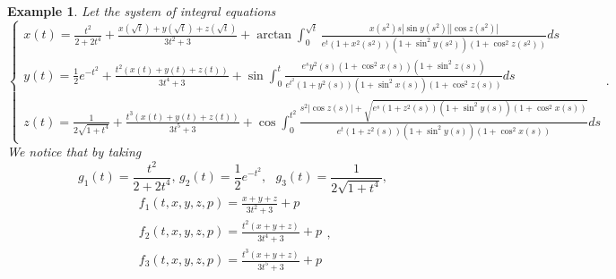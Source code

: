 \documentclass{amsart}
\theoremstyle{plain}
\newtheorem{example}{Example}
\numberwithin{equation}{section}
\begin{document}
\begin{example}
Let the system of integral equations\begin{equation*}
\left\{ 
\begin{array}{l}
x\left( t\right) =\frac{t^{2}}{2+2t^{4}}+\frac{x\left( \sqrt{t}\right)
+y\left( \sqrt{t}\right) +z\left( \sqrt{t}\right) }{3t^{2}+3}+\arctan
\int_{0}^{\sqrt{t}}\frac{x\left( s^{2}\right) s\left\vert \sin y\left(
s^{2}\right) \right\vert \left\vert \cos z\left( s^{2}\right) \right\vert }{e^{t}\left( 1+x^{2}\left( s^{2}\right) \right) \left( 1+\sin ^{2}y\left(
s^{2}\right) \right) \left( 1+\cos ^{2}z\left( s^{2}\right) \right) }ds \\ 
y\left( t\right) =\frac{1}{2}e^{-t^{2}}+\frac{t^{2}\left( x\left( t\right)
+y\left( t\right) +z\left( t\right) \right) }{3t^{4}+3}+\sin \int_{0}^{t}\frac{e^{s}y^{2}\left( s\right) \left( 1+\cos ^{2}x\left( s\right) \right)
\left( 1+\sin ^{2}z\left( s\right) \right) }{e^{t^{2}}\left( 1+y^{2}\left(
s\right) \right) \left( 1+\sin ^{2}x\left( s\right) \right) \left( 1+\cos
^{2}z\left( s\right) \right) }ds \\ 
z\left( t\right) =\frac{1}{2\sqrt{1+t^{4}}}+\frac{t^{3}\left( x\left(
t\right) +y\left( t\right) +z\left( t\right) \right) }{3t^{5}+3}+\cos
\int_{0}^{t^{2}}\frac{s^{2}\left\vert \cos z\left( s\right) \right\vert +\sqrt{e^{s}\left( 1+z^{2}\left( s\right) \right) \left( 1+\sin ^{2}y\left(
s\right) \right) \left( 1+\cos ^{2}x\left( s\right) \right) }}{e^{t}\left(
1+z^{2}\left( s\right) \right) \left( 1+\sin ^{2}y\left( s\right) \right)
\left( 1+\cos ^{2}x\left( s\right) \right) }ds\end{array}\right. .
\end{equation*}We notice that by taking\begin{equation*}
g_{1}\left( t\right) =\frac{t^{2}}{2+2t^{4}}\text{, }g_{2}\left( t\right) =\frac{1}{2}e^{-t^{2}},\text{ }g_{3}\left( t\right) =\frac{1}{2\sqrt{1+t^{4}}},
\end{equation*}\begin{equation*}
\begin{array}{l}
f_{1}\left( t,x,y,z,p\right) =\frac{x+y+z}{3t^{2}+3}+p \\ 
f_{2}\left( t,x,y,z,p\right) =\frac{t^{2}\left( x+y+z\right) }{3t^{4}+3}+p
\\ 
f_{3}\left( t,x,y,z,p\right) =\frac{t^{3}\left( x+y+z\right) }{3t^{5}+3}+p\end{array},
\end{equation*}\begin{eqnarray*}

\end{eqnarray*}
\end{example}
\end{document}
